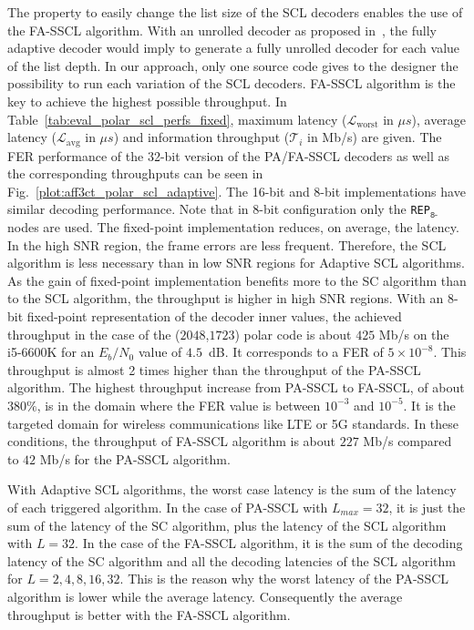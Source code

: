 The property to easily change the list size of the SCL decoders enables the use
of the FA-SSCL algorithm. With an unrolled decoder as proposed
in~\cite{Sarkis2016}, the fully adaptive decoder would imply to generate a fully
unrolled decoder for each value of the list depth. In our approach, only one
source code gives to the designer the possibility to run each variation of the
SCL decoders. FA-SSCL algorithm is the key to achieve the highest possible
throughput. In Table~\ref{tab:eval_polar_scl_perfs_fixed}, maximum latency
($\mathcal{L}_\text{worst}$ in $\mu s$), average latency
($\mathcal{L}_\text{avg}$ in $\mu s$) and information throughput
($\mathcal{T}_i$ in Mb/s) are given. The FER performance of the 32-bit version
of the PA/FA-SSCL decoders as well as the corresponding throughputs can be seen
in Fig.~\ref{plot:aff3ct_polar_scl_adaptive}. The 16-bit and 8-bit
implementations have similar decoding performance. Note that in 8-bit
configuration only the \texttt{REP}$_{\texttt{8-}}$ nodes are used. The
fixed-point implementation reduces, on average, the latency. In the high SNR
region, the frame errors are less frequent. Therefore, the SCL algorithm is less
necessary than in low SNR regions for Adaptive SCL algorithms. As the gain of
fixed-point implementation benefits more to the SC algorithm than to the SCL
algorithm, the throughput is higher in high SNR regions. With an 8-bit
fixed-point representation of the decoder inner values, the achieved throughput
in the case of the ($2048$,$1723$) polar code is about $425$ Mb/s on the
i5-6600K for an $E_b/N_0$ value of $4.5$~dB. It corresponds to a FER of
$5\times10^{-8}$. This throughput is almost 2 times higher than the throughput
of the PA-SSCL algorithm. The highest throughput increase from PA-SSCL to
FA-SSCL, of about $380\%$, is in the domain where the FER value is between
$10^{-3}$ and $10^{-5}$. It is the targeted domain for wireless communications
like LTE or 5G standards. In these conditions, the throughput of FA-SSCL
algorithm is about $227$ Mb/s compared to $42$ Mb/s for the PA-SSCL algorithm.

With Adaptive SCL algorithms, the worst case latency is the sum of the latency
of each triggered algorithm. In the case of PA-SSCL with $L_{max}=32$, it is
just the sum of the latency of the SC algorithm, plus the latency of the SCL
algorithm with $L=32$. In the case of the FA-SSCL algorithm, it is the sum of
the decoding latency of the SC algorithm and all the decoding latencies of the
SCL algorithm for $L={2,4,8,16,32}$. This is the reason why the worst latency of
the PA-SSCL algorithm is lower while the average latency. Consequently the
average throughput is better with the FA-SSCL algorithm.

